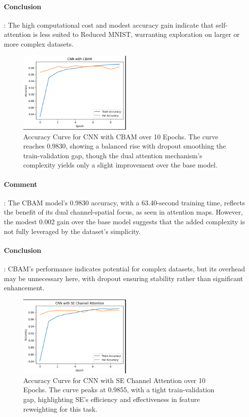 \documentclass[12pt]{article}
\begin{document}
\paragraph{Conclusion}: The high computational cost and modest accuracy gain indicate that self-attention is less suited to Reduced MNIST, warranting exploration on larger or more complex datasets.
\begin{figure}[H]
    \centering
    \includegraphics[width=0.5\textwidth]{accuracy_curve_cbam.png}
    \caption{Accuracy Curve for CNN with CBAM over 10 Epochs. The curve reaches 0.9830, showing a balanced rise with dropout smoothing the train-validation gap, though the dual attention mechanism's complexity yields only a slight improvement over the base model.}
    \label{fig:accuracy_curve_cbam}

\end{figure}
\paragraph{Comment}: The CBAM model's 0.9830 accuracy, with a 63.40-second training time, reflects the benefit of its dual channel-spatial focus, as seen in attention maps. However, the modest 0.002 gain over the base model suggests that the added complexity is not fully leveraged by the dataset's simplicity.
\paragraph{Conclusion}: CBAM's performance indicates potential for complex datasets, but its overhead may be unnecessary here, with dropout ensuring stability rather than significant enhancement.
\begin{figure}[H]
    \centering
    \includegraphics[width=0.5\textwidth]{accuracy_curve_se.png}
    \caption{Accuracy Curve for CNN with SE Channel Attention over 10 Epochs. The curve peaks at 0.9855, with a tight train-validation gap, highlighting SE's efficiency and effectiveness in feature reweighting for this task.}
    \label{fig:accuracy_curve_se}

\end{figure}
\end{document}
